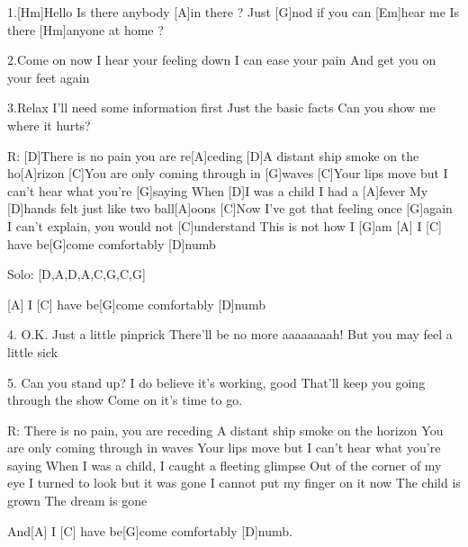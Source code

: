 
1.[Hm]Hello
Is there anybody [A]in there ?
Just [G]nod if you can [Em]hear me
Is there [Hm]anyone at home ?

2.Come on now
I hear your feeling down
I can ease your pain
And get you on your feet again

3.Relax
I'll need some information first
Just the basic facts
Can you show me where it hurts?

R: [D]There is no pain you are re[A]ceding
[D]A distant ship smoke on the ho[A]rizon
[C]You are only coming through in [G]waves
[C]Your lips move but I can't hear what you're [G]saying
When [D]I was a child I had a [A]fever
My [D]hands felt just like two ball[A]oons
[C]Now I've got that feeling once [G]again
I can't explain, you would not [C]understand
This is not how I [G]am
[A] I [C] have be[G]come comfortably [D]numb

Solo:
[D,A,D,A,C,G,C,G]

[A] I [C] have be[G]come comfortably [D]numb

4. O.K.
Just a little pinprick
There'll be no more aaaaaaaah!
But you may feel a little sick

5. Can you stand up?
I do believe it's working, good
That'll keep you going through the show
Come on it's time to go.

R: There is no pain, you are receding
A distant ship smoke on the horizon
You are only coming through in waves
Your lips move but I can't hear what you're saying
When I was a child, I caught a fleeting glimpse
Out of the corner of my eye
I turned to look but it was gone
I cannot put my finger on it now
The child is grown
The dream is gone

And[A] I [C] have be[G]come comfortably [D]numb.